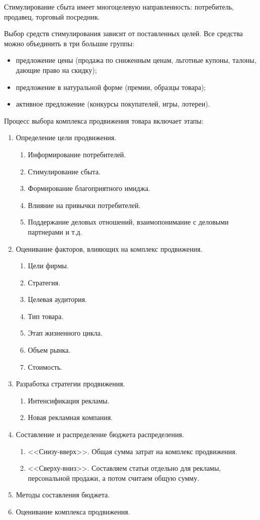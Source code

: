 \documentclass[a4paper,12pt,oneside,final]{extarticle}
\numberwithin{equation}{section}
\begin{document}
\begin{enumerate}
Стимулирование сбыта имеет многоцелевую направленность: потребитель, продавец, торговый посредник.

Выбор средств стимулирования зависит от поставленных целей. 
Все средства можно объединить в три большие группы:
\begin{itemize}
	\item предложение цены (продажа по сниженным ценам, льготные купоны, талоны, дающие право на скидку);
	\item предложение в натуральной форме (премии, образцы товара);
	\item активное предложение (конкурсы покупателей, игры, лотереи).
\end{itemize}

Процесс выбора комплекса продвижения товара включает этапы:
\begin{enumerate}
	\item Определение цели продвижения. 	
	\begin{enumerate}
		\item Информирование потребителей.
		\item Стимулирование сбыта.
		\item Формирование благоприятного имиджа.
		\item Влияние на привычки потребителей.
		\item Поддержание деловых отношений, взаимопонимание с деловыми партнерами и т.д.
	\end{enumerate}
	\item Оценивание факторов, влияющих на комплекс продвижения.		
	\begin{enumerate}
		\item Цели фирмы.
		\item Стратегия.
		\item Целевая аудитория.
		\item Тип товара.
		\item Этап жизненного цикла.
		\item Объем рынка.
		\item Стоимость.
	\end{enumerate}
	\item Разработка стратегии продвижения.	
	\begin{enumerate}
		\item Интенсификация рекламы.
		\item Новая рекламная компания.
	\end{enumerate}
	\item Составление и распределение бюджета распределения.	
	\begin{enumerate}
		\item <<Снизу-вверх>>. Общая сумма затрат на комплекс продвижения.
		\item <<Сверху-вниз>>. Составляем статьи отдельно для рекламы, персональной продажи, а потом считаем общую сумму.
	\end{enumerate}
	\item Методы составления бюджета.	
	\item Оценивание комплекса продвижения.	
\end{enumerate}


\end{enumerate}
\end{document}
